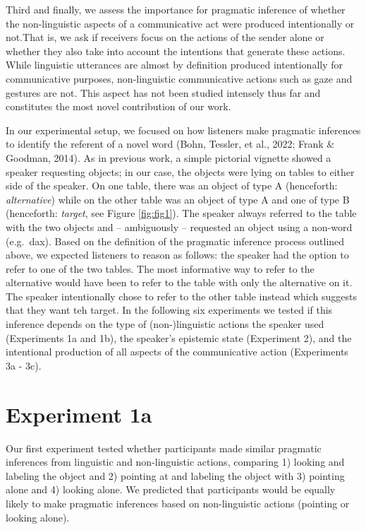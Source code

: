 \documentclass[
  man,floatsintext]{apa6}
\begin{document}
Third and finally, we assess the importance for pragmatic inference of whether the non-linguistic aspects of a communicative act were produced intentionally or not.That is, we ask if receivers focus on the actions of the sender alone or whether they also take into account the intentions that generate these actions. While linguistic utterances are almost by definition produced intentionally for communicative purposes, non-linguistic communicative actions such as gaze and gestures are not. This aspect has not been studied intensely thus far and constitutes the most novel contribution of our work.

In our experimental setup, we focused on how listeners make pragmatic inferences to identify the referent of a novel word (Bohn, Tessler, et al., 2022; Frank \& Goodman, 2014). As in previous work, a simple pictorial vignette showed a speaker requesting objects; in our case, the objects were lying on tables to either side of the speaker. On one table, there was an object of type A (henceforth: \emph{alternative}) while on the other table was an object of type A and one of type B (henceforth: \emph{target}, see Figure \ref{fig:fig1}). The speaker always referred to the table with the two objects and -- ambiguously -- requested an object using a non-word (e.g.~dax). Based on the definition of the pragmatic inference process outlined above, we expected listeners to reason as follows: the speaker had the option to refer to one of the two tables. The most informative way to refer to the alternative would have been to refer to the table with only the alternative on it. The speaker intentionally chose to refer to the other table instead which suggests that they want teh target. In the following six experiments we tested if this inference depends on the type of (non-)linguistic actions the speaker used (Experiments 1a and 1b), the speaker's epistemic state (Experiment 2), and the intentional production of all aspects of the communicative action (Experiments 3a - 3c).

\section{Experiment 1a}\label{experiment-1a}

Our first experiment tested whether participants made similar pragmatic inferences from linguistic and non-linguistic actions, comparing 1) looking and labeling the object and 2) pointing at and labeling the object with 3) pointing alone and 4) looking alone. We predicted that participants would be equally likely to make pragmatic inferences based on non-linguistic actions (pointing or looking alone).
\end{document}
